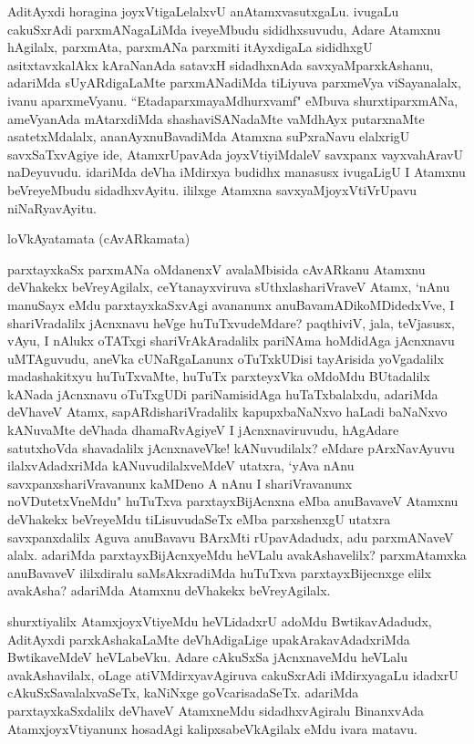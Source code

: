 \begin{artha}
AditAyxdi horagina joyxVtigaLelalxvU anAtamxvasutxgaLu. ivugaLu cakuSxrAdi parxmANagaLiMda iveyeMbudu sididhxsuvudu, Adare Atamxnu hAgilalx, parxmAta, parxmANa parxmiti itAyxdigaLa sididhxgU asitxtavxkalAkx kAraNanAda satavxH sidadhxnAda savxyaMparxkAshanu, adariMda sUyARdigaLaMte parxmANadiMda tiLiyuva parxmeVya viSayanalalx, ivanu aparxmeVyanu. ``EtadaparxmayaMdhurxvamf" eMbuva shurxtiparxmANa, ameVyanAda mAtarxdiMda shashaviSANadaMte vaMdhAyx putarxnaMte asatetxMdalalx, ananAyxnuBavadiMda Atamxna suPxraNavu elalxrigU savxSaTxvAgiye ide, AtamxrUpavAda joyxVtiyiMdaleV savxpanx vayxvahAravU naDeyuvudu. idariMda deVha iMdirxya budidhx manasusx ivugaLigU I Atamxnu beVreyeMbudu sidadhxvAyitu. ililxge Atamxna savxyaMjoyxVtiVrUpavu niNaRyavAyitu.
\end{artha}

\begin{center}%
loVkAyatamata (cAvARkamata)
\end{center}

\begin{artha}
parxtayxkaSx parxmANa oMdanenxV avalaMbisida cAvARkanu Atamxnu deVhakekx beVreyAgilalx, ceYtanayxviruva sUthxlashariVraveV Atamx, `nAnu manuSayx eMdu parxtayxkaSxvAgi avananunx anuBavamADikoMDidedxVve, I shariVradalilx jAcnxnavu heVge huTuTxvudeMdare? paqthiviV, jala, teVjasusx, vAyu, I nAlukx oTATxgi shariVrAkAradalilx pariNAma hoMdidAga jAcnxnavu uMTAguvudu, aneVka cUNaRgaLanunx oTuTxkUDisi tayArisida yoVgadalilx madashakitxyu huTuTxvaMte, huTuTx parxteyxVka oMdoMdu BUtadalilx kANada jAcnxnavu oTuTxgUDi pariNamisidAga huTaTxbalalxdu, adariMda deVhaveV Atamx, sapARdishariVradalilx kapupxbaNaNxvo haLadi baNaNxvo kANuvaMte deVhada dhamaRvAgiyeV I jAcnxnaviruvudu, hAgAdare satutxhoVda shavadalilx jAcnxnaveVke! kANuvudilalx? eMdare pArxNavAyuvu ilalxvAdadxriMda kANuvudilalxveMdeV utatxra, `yAva nAnu savxpanxshariVravanunx kaMDeno A nAnu I shariVravanunx noVDutetxVneMdu" huTuTxva parxtayxBijAcnxna eMba anuBavaveV Atamxnu deVhakekx beVreyeMdu tiLisuvudaSeTx eMba parxshenxgU utatxra savxpanxdalilx Aguva anuBavavu BArxMti rUpavAdadudx, adu parxmANaveV alalx. adariMda parxtayxBijAcnxyeMdu heVLalu avakAshavelilx? parxmAtamxka anuBavaveV ililxdiralu saMsAkxradiMda huTuTxva parxtayxBijecnxge elilx avakAsha? adariMda Atamxnu deVhakekx beVreyAgilalx. 
\end{artha}

\begin{artha}
shurxtiyalilx AtamxjoyxVtiyeMdu heVLidadxrU adoMdu BwtikavAdadudx, AditAyxdi parxkAshakaLaMte deVhAdigaLige upakArakavAdadxriMda BwtikaveMdeV heVLabeVku. Adare cAkuSxSa jAcnxnaveMdu heVLalu avakAshavilalx, oLage atiVMdirxyavAgiruva cakuSxrAdi iMdirxyagaLu idadxrU cAkuSxSavalalxvaSeTx, kaNiNxge goVcarisadaSeTx. adariMda parxtayxkaSxdalilx deVhaveV AtamxneMdu sidadhxvAgiralu BinanxvAda AtamxjoyxVtiyanunx hosadAgi kalipxsabeVkAgilalx eMdu ivara matavu.
\end{artha}

